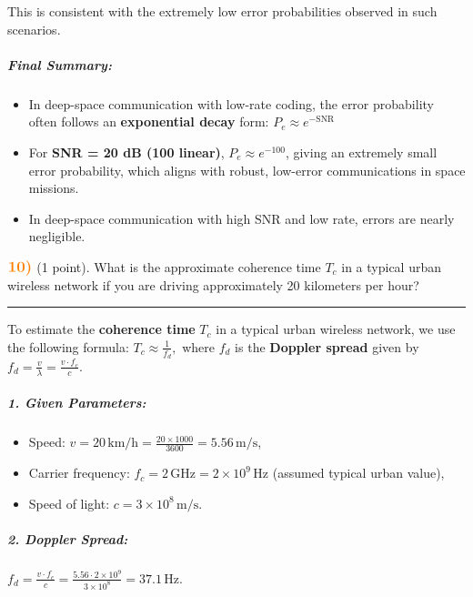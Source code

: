 \documentclass[11pt]{article}
\providecommand{\tightlist}{%
      \setlength{\itemsep}{0pt}\setlength{\parskip}{0pt}}
\begin{document}
This is consistent with the extremely low error probabilities observed
in such scenarios.

\subparagraph{\texorpdfstring{\textbf{Final
Summary:}}{Final Summary:}}\label{final-summary}

\begin{itemize}
\tightlist
\item
  In deep-space communication with low-rate coding, the error
  probability often follows an \textbf{exponential decay} form:
  \(P_e \approx e^{-\text{SNR}}\)
\item
  For \textbf{SNR = 20 dB (100 linear)}, \(P_e \approx e^{-100}\),
  giving an extremely small error probability, which aligns with robust,
  low-error communications in space missions.
\item
  In deep-space communication with high SNR and low rate, errors are
  nearly negligible.
\end{itemize}

    \(\color{orange} \large \textbf{10)}\) (1 point). What is the
approximate coherence time \(T_c\) in a typical urban wireless network
if you are driving approximately 20 kilometers per hour?

    \begin{center}\rule{0.5\linewidth}{0.5pt}\end{center}

To estimate the \textbf{coherence time} \(T_c\) in a typical urban
wireless network, we use the following formula:
\(T_c \approx \frac{1}{f_d},\) where \(f_d\) is the \textbf{Doppler
spread} given by \(f_d = \frac{v}{\lambda} = \frac{v \cdot f_c}{c}.\)

\subparagraph{\texorpdfstring{\textbf{1. Given
Parameters}:}{1. Given Parameters:}}\label{given-parameters}

\begin{itemize}
\tightlist
\item
  Speed:
  \(v = 20 \, \text{km/h} = \frac{20 \times 1000}{3600} = 5.56 \, \text{m/s}\),
\item
  Carrier frequency:
  \(f_c = 2 \, \text{GHz} = 2 \times 10^9 \, \text{Hz}\) (assumed
  typical urban value),
\item
  Speed of light: \(c = 3 \times 10^8 \, \text{m/s}\).
\end{itemize}

\subparagraph{\texorpdfstring{\textbf{2. Doppler
Spread}:}{2. Doppler Spread:}}\label{doppler-spread}

\(f_d = \frac{v \cdot f_c}{c} = \frac{5.56 \cdot 2 \times 10^9}{3 \times 10^8} = 37.1 \, \text{Hz}.\)
\end{document}
